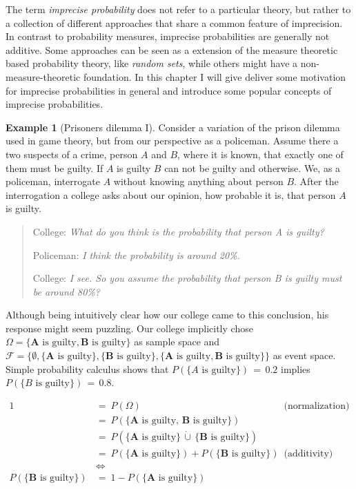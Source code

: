 \documentclass[
]{report}
\theoremstyle{definition}
\newtheorem{example}{Example}[section]
\begin{document}
The term \textit{imprecise probability} does not refer to a particular
theory, but rather to a collection of different approaches that share a
common feature of imprecision. In contrast to probability measures,
imprecise probabilities are generally not additive. Some approaches can
be seen as a extension of the measure theoretic based probability
theory, like \textit{random sets}, while others might have a
non-measure-theoretic foundation. In this chapter I will give deliver
some motivation for imprecise probabilities in general and introduce
some popular concepts of imprecise probabilities.

\begin{example}[Prisoners dilemma I]
Consider a variation of the prison dilemma used in game theory, but from our perspective as a policeman. Assume there a two suspects of a crime, person $A$ and $B$, where it is known, that exactly one of them must be guilty. If $A$ is guilty $B$ can not be guilty and otherwise. We, as a policeman, interrogate $A$ without knowing anything about person $B$. After the interrogation a college asks about our opinion, how probable it is, that person $A$ is guilty.

\begin{quote}
College: \textit{What do you think is the probability that person A is guilty?} \par
Policeman: \textit{I think the probability is around 20\%.} \par
College: \textit{I see. So you assume the probability that person B is guilty must be around 80\%?}
\end{quote}

Although being intuitively clear how our college came to this conclusion, his response might seem puzzling. Our college implicitly chose $\Omega = \{\mathbf{A} \text{ is guilty}, \mathbf{B} \text{ is guilty} \}$ as sample space and $\mathcal{F} = \{ \emptyset, \{ \mathbf{A} \text{ is guilty} \}, \{ \mathbf{B} \text{ is guilty} \}, \{ \mathbf{A} \text{ is guilty}, \mathbf{B} \text{ is guilty} \} \}$ as event space. Simple probability calculus shows that $P(\{A \text{ is guilty}\}) \, = \, 0.2$ implies $P(\{B \text{ is guilty}\}) \, = \,  0.8$.

\begin{align*}
1 \ &= \ P(\Omega) & \text{(normalization)}\\
  &= \ P(\{\mathbf{A} \text{ is guilty}, \, \mathbf{B} \text{ is guilty}\}) \\
  &= \ P(\{\mathbf{A} \text{ is guilty}\} \, \dot\cup \, \{\mathbf{B} \text{ is guilty}\}) & \text{}\\
  &= \ P(\{\mathbf{A} \text{ is guilty}\}) + P(\{\mathbf{B} \text{ is guilty}\}) & \text{(additivity)}\\
  & \Leftrightarrow \\
P(\{\mathbf{B} \text{ is guilty}\}) \ &= \ 1 - P(\{\mathbf{A} \text{ is guilty}\})
\end{align*}



\end{example}
\end{document}
